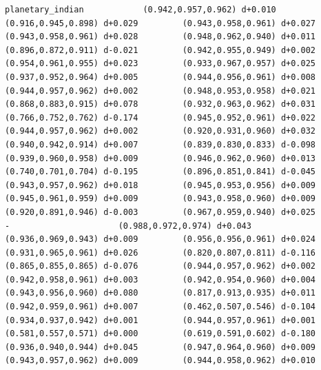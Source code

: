 \documentclass[11pt, letterpaper, openany]{book}
\begin{document}
\begin{empiricalbox}
\begin{lstlisting}[style=terminal]
planetary_indian            (0.942,0.957,0.962) d+0.010         (0.916,0.945,0.898) d+0.029         (0.943,0.958,0.961) d+0.027         (0.943,0.958,0.961) d+0.028         (0.948,0.962,0.940) d+0.011         (0.896,0.872,0.911) d-0.021         (0.942,0.955,0.949) d+0.002         (0.954,0.961,0.955) d+0.023         (0.933,0.967,0.957) d+0.025         (0.937,0.952,0.964) d+0.005         (0.944,0.956,0.961) d+0.008         (0.944,0.957,0.962) d+0.002         (0.948,0.953,0.958) d+0.021         (0.868,0.883,0.915) d+0.078         (0.932,0.963,0.962) d+0.031         (0.766,0.752,0.762) d-0.174         (0.945,0.952,0.961) d+0.022         (0.944,0.957,0.962) d+0.002         (0.920,0.931,0.960) d+0.032         (0.940,0.942,0.914) d+0.007         (0.839,0.830,0.833) d-0.098         (0.939,0.960,0.958) d+0.009         (0.946,0.962,0.960) d+0.013         (0.740,0.701,0.704) d-0.195         (0.896,0.851,0.841) d-0.045         (0.943,0.957,0.962) d+0.018         (0.945,0.953,0.956) d+0.009         (0.945,0.961,0.959) d+0.009         (0.943,0.958,0.960) d+0.009         (0.920,0.891,0.946) d-0.003         (0.967,0.959,0.940) d+0.025                      -                      (0.988,0.972,0.974) d+0.043         (0.936,0.969,0.943) d+0.009         (0.956,0.956,0.961) d+0.024         (0.931,0.965,0.961) d+0.026         (0.820,0.807,0.811) d-0.116         (0.865,0.855,0.865) d-0.076         (0.944,0.957,0.962) d+0.002         (0.942,0.958,0.961) d+0.003         (0.942,0.954,0.960) d+0.004         (0.943,0.956,0.960) d+0.080         (0.817,0.913,0.935) d+0.011         (0.942,0.959,0.961) d+0.007         (0.462,0.507,0.546) d-0.104         (0.934,0.937,0.942) d+0.001         (0.944,0.957,0.961) d+0.001         (0.581,0.557,0.571) d+0.000         (0.619,0.591,0.602) d-0.180         (0.936,0.940,0.944) d+0.045         (0.947,0.964,0.960) d+0.009         (0.943,0.957,0.962) d+0.009         (0.944,0.958,0.962) d+0.010     

\end{lstlisting}
\end{empiricalbox}
\end{document}

